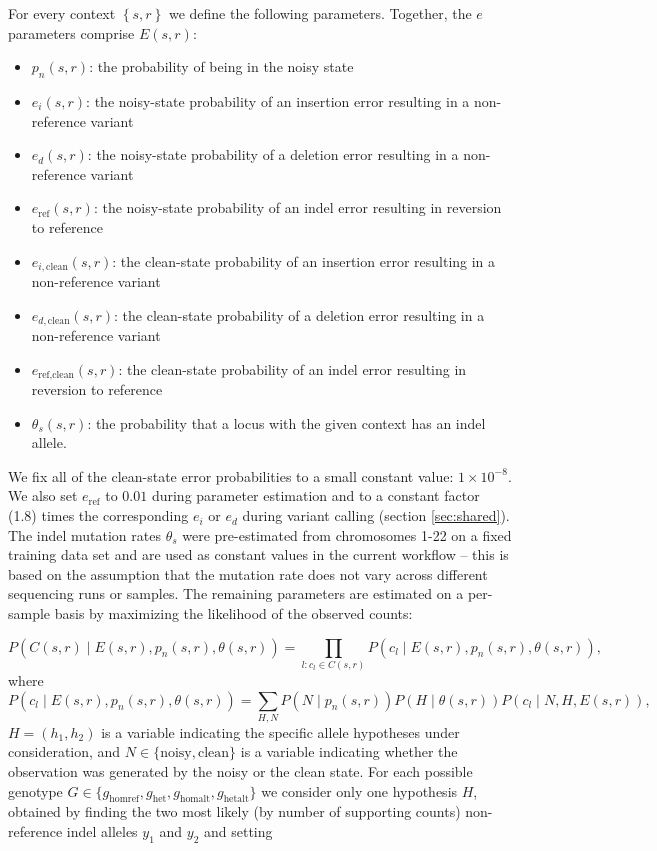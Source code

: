 \documentclass{article}
\begin{document}
For every context $\left\{ s,r \right\}$ we define the following parameters. Together, the $e$ parameters comprise $E(s,r)$:
\begin{itemize}
\item $p_n(s,r)$: the probability of being in the noisy state
\item $e_i(s,r)$: the noisy-state probability of an insertion error resulting in a non-reference variant
\item $e_d(s,r)$: the noisy-state probability of a deletion error resulting in a non-reference variant
\item $e_{\text{ref}}(s,r)$: the noisy-state probability of an indel error resulting in reversion to reference
\item $e_{i,\text{clean}}(s,r)$: the clean-state probability of an insertion error resulting in a non-reference variant
\item $e_{d,\text{clean}}(s,r)$: the clean-state probability of a deletion error resulting in a non-reference variant
\item $e_{\text{ref},\text{clean}}(s,r)$: the clean-state probability of an indel error resulting in reversion to reference
\item $\theta_s(s,r)$: the probability that a locus with the given context has an indel allele.
\end{itemize}
We fix all of the clean-state error probabilities to a small constant value: $1 \times 10^{-8}$. We also set $e_{\text{ref}}$ to $0.01$ during parameter estimation and to a constant factor (1.8) times the corresponding $e_i$ or $e_d$ during variant calling (section \ref{sec:shared}). The indel mutation rates $\theta_s$ were pre-estimated from chromosomes 1-22 on a fixed training data set and are used as constant values in the current workflow -- this is based on the assumption that the mutation rate does not vary across different sequencing runs or samples. The remaining parameters are estimated on a per-sample basis by maximizing the likelihood of the observed counts:

\begin{equation*}
P(C(s,r) \mid E(s,r), p_n(s,r), \theta(s,r)) = \prod_{l: c_l\in C(s,r)}P(c_l \mid E(s,r), p_n(s,r), \theta(s,r)),
\end{equation*}
where
\begin{equation*}
P(c_l \mid E(s,r), p_n(s,r), \theta(s,r)) = \sum_{H,N} P(N \mid p_n(s,r)) P(H \mid \theta(s,r)) P(c_l \mid N,H,E(s,r)),
\end{equation*}
$H=(h_1, h_2)$ is a variable indicating the specific allele hypotheses under consideration, and $N \in \{ \text{noisy}, \text{clean} \}$ is a variable indicating whether the observation was generated by the noisy or the clean state. For each possible genotype $G \in \{ g_\text{homref}, g_\text{het}, g_\text{homalt}, g_\text{hetalt} \}$ we consider only one hypothesis $H$, obtained by finding the two most likely (by number of supporting counts) non-reference indel alleles $y_1$ and $y_2$ and setting
\end{document}
